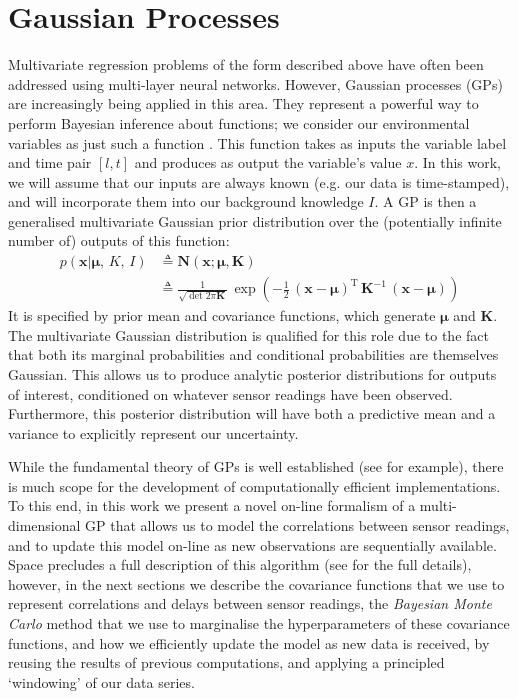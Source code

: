 \documentclass{acmtrans2m}
\newcommand{\p}[2]{p\!\left(\left.#1\right|#2\right)}
\newcommand{\vect}[1]{\boldsymbol{#1}}
\newcommand{\vx}{\vect{x}}
\newcommand{\vmu}{\vect{\mu}}
\newcommand{\mat}[1]{\mathbf{#1}}
\newcommand{\N}[3]{\mat{N}\!\left(#1;#2,#3\right)}
\newcommand{\tr}{\mathrm{T}}
\newcommand{\defequal}{\triangleq}
\begin{document}
\section{Gaussian Processes}\label{sec_gp}

\noindent Multivariate regression problems of the form described above have often been addressed using multi-layer neural networks. However, Gaussian processes (GPs) are increasingly being applied in this area. They represent a powerful way to perform Bayesian inference about functions; we consider our environmental variables as just such a function \cite{GPsBook}. This function takes as inputs the variable label and time pair $[l,t]$ and produces as output the variable's value $x$. In this work, we will assume that our inputs are always known (e.g. our data is time-stamped), and will incorporate them into our background knowledge $I$. A GP is then a generalised multivariate Gaussian prior distribution over the (potentially infinite number of) outputs of this function:
\small\begin{align}\label{eq:GPDefn}
\p{\vx}{\vmu,\,K,\,I} & \defequal \N{\vx}{\vmu}{\mat{K}}\nonumber\\
& \defequal\frac{1}{\sqrt{\det{2\pi\mat{K}}}}\,\exp \left(-\frac{1}{2}\,(\vx-\vmu)^\tr\,\mat{K}^{-1}\,(\vx-\vmu)\right)
\end{align}\normalsize
It is specified by prior mean and covariance functions, which generate $\vmu$ and $\mat{K}$.
 The multivariate Gaussian distribution is qualified for this role due to the fact that both its marginal probabilities and conditional probabilities are themselves Gaussian. This allows us to produce analytic posterior distributions for outputs of interest, conditioned on whatever sensor readings have been observed. Furthermore, this posterior distribution will have both a predictive mean and a variance to explicitly represent our uncertainty.

While the fundamental theory of GPs is well established (see  for example), there is much scope for the development of computationally efficient implementations. To this end, in this work we present a novel on-line formalism of a multi-dimensional GP that allows us to model the correlations between sensor readings, and to update this model on-line as new observations are sequentially available. Space precludes a full description of this algorithm (see \cite{gp_mike} for the full details), however, in the next sections we describe the covariance functions that we use to represent correlations and delays between sensor readings, the {\em Bayesian Monte Carlo} method that we use to marginalise the hyperparameters of these covariance functions, and how we efficiently update the model as new data is received, by reusing the results of previous computations, and applying a principled `windowing' of our data series.
\end{document}
